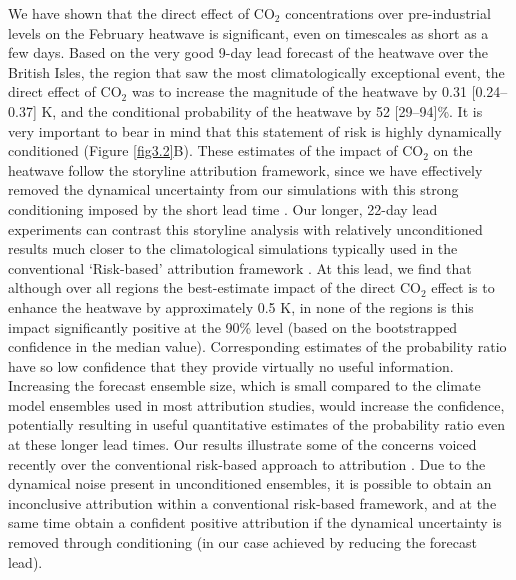   We have shown that the direct effect of CO$_2$ concentrations over pre-industrial levels on the February heatwave is significant, even on timescales as short as a few days. Based on the very good 9-day lead forecast of the heatwave over the British Isles, the region that saw the most climatologically exceptional event, the direct effect of CO$_2$ was to increase the magnitude of the heatwave by 0.31 [0.24--0.37] K, and the conditional probability of the heatwave by 52 [29--94]\%. It is very important to bear in mind that this statement of risk is highly dynamically conditioned (Figure \ref{fig3.2}B). These estimates of the impact of CO$_2$ on the heatwave follow the storyline attribution framework, since we have effectively removed the dynamical uncertainty from our simulations with this strong conditioning imposed by the short lead time \citep{shepherd_common_2016,shepherd_storylines_2018,jezequel_behind_2018}. Our longer, 22-day lead experiments can contrast this storyline analysis with relatively unconditioned results much closer to the climatological simulations typically used in the conventional `Risk-based' attribution framework \citep{philip_protocol_2020,stott_human_2004}. At this lead, we find that although over all regions the best-estimate impact of the direct CO$_2$ effect is to enhance the heatwave by approximately 0.5 K, in none of the regions is this impact significantly positive at the 90\% level (based on the bootstrapped confidence in the median value). Corresponding estimates of the probability ratio have so low confidence that they provide virtually no useful information. Increasing the forecast ensemble size, which is small compared to the climate model ensembles used in most attribution studies, would increase the confidence, potentially resulting in useful quantitative estimates of the probability ratio even at these longer lead times. Our results illustrate some of the concerns voiced recently over the conventional risk-based approach to attribution \citep{winsberg_severe_2020,shepherd_common_2016}. Due to the dynamical noise present in unconditioned ensembles, it is possible to obtain an inconclusive attribution within a conventional risk-based framework, and at the same time obtain a confident positive attribution if the dynamical uncertainty is removed through conditioning (in our case achieved by reducing the forecast lead).
  

